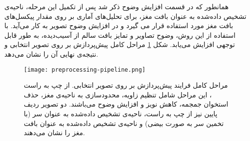 همانطور که در قسمت افزایش وضوح ذکر شد پس از تکمیل این مرحله، ناحیه‌ی تشخیص داده‌شده به عنوان بافت مغز، برای تحلیل‌های آماری بر روی مقدار پیکسل‌های بافت مغز مورد استفاده قرار می گیرد و در افزایش وضوح تصویر به کار می‌آید.
با استفاده از این روش، وضوح تصاویر و تمایز بافت سالم از آسیب‌دیده، به طور قابل توجهی افزایش می‌یابد.
شکل \ref{fig:preprocessing-pipeline}
مراحل کامل پیش‌پردازش بر روی تصویر انتخابی و نتیجه‌ی نهایی آن را نشان می‌دهد.

\begin{figure}[ht]
\centering
\texttt{[image: preprocessing-pipeline.png]}
\caption[]{مراحل کامل فرایند پیش‌پردازش بر روی تصویر انتخابی. از چپ به راست ، این مراحل شامل تنظیم زاویه، محدودسازی به ناحیه‌ی مغز، حذف استخوان جمجمه، کاهش نویز و افزایش وضوح می‌باشند. دو تصویر ردیف پایین نیز از چپ به راست، ناحیه‌ی تشخیص داده‌شده به عنوان سر (با تخمین سر به صورت بیضی) و ناحیه‌ی تشخیص داده‌شده به عنوان بافت مغز را نشان می‌دهند.}
\label{fig:preprocessing-pipeline}
\end{figure}

